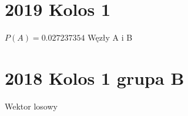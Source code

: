 \documentclass{exam}
\begin{document}
    \section {2019 Kolos 1}
    \begin{questions}
        \question $P(A) =  0.027237354$
        \question Węzły A i B
    \end{questions}
    \section {2018 Kolos 1 grupa B}
    \begin{questions}
        \question Wektor losowy
    \end{questions}
\end{document}

